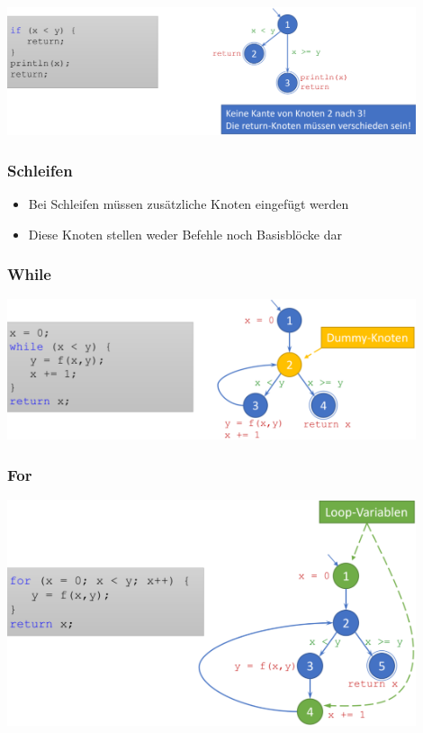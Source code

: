 \documentclass[11pt, a4paper]{article}
\begin{document}
\centering \includegraphics[width=0.9\textwidth]{Graphen-09.png} 

\raggedright

\newpage

\subsubsection*{Schleifen}

\vspace{1em}

\begin{itemize}
    \item Bei Schleifen müssen zusätzliche Knoten eingefügt werden
    \item Diese Knoten stellen weder Befehle noch Basisblöcke dar
\end{itemize}

\subsubsection{While}

\centering \includegraphics[width=0.9\textwidth]{Graphen-10.png} 

\raggedright

\subsubsection{For}

\centering \includegraphics[width=0.9\textwidth]{Graphen-11.png} 
\end{document}

